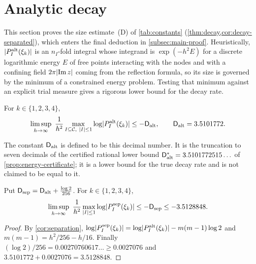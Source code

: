 \section{Analytic decay}\label{sec:decay}

This section proves the size estimate~(D) of \cref{tab:constants}
(\cref{thm:decay,cor:decay-separated}), which enters the final deduction in
\cref{subsec:main-proof}. Heuristically, $\lvert P^{\mathrm{alt}}_I(\xi_k)\rvert$ is an $n_I$-fold integral whose
integrand is $\exp(-h^2E)$ for a discrete logarithmic energy $E$ of free points interacting with
the nodes and with a confining field $2\pi\lvert \operatorname{Im}z\rvert$ coming from the reflection
formula, so its size is governed by the minimum of a constrained energy problem. Testing that
minimum against an explicit trial measure gives a rigorous lower bound for the decay rate.

\begin{theorem}\label{thm:decay}
For $k\in\{1,2,3,4\}$,
\[
  \limsup_{h\to\infty}\ \frac1{h^2}\max_{I\subseteq\Com,\ \abs I\le1}\log\abs{P^{\alt}_I(\xi_k)}
  \le-\cD_{\alt},\qquad \cD_{\alt}=3.5101772 .
\]
\end{theorem}

The constant $\mathsf{D}_{\mathrm{alt}}$ is defined to be this decimal number. It is the truncation to seven
decimals of the certified rational lower bound $\mathsf{D}^{*}_{\mathrm{alt}}=3.5101772515\ldots$ of
\cref{prop:energy-certificate}; it is a lower bound for the true decay rate and is not claimed
to be equal to it.

\begin{corollary}\label{cor:decay-separated}
Put $\mathsf{D}_{\mathrm{sep}}=\mathsf{D}_{\mathrm{alt}}+\frac{\log2}{256}$. For $k\in\{1,2,3,4\}$,
\[
  \limsup_{h\to\infty}\ \frac1{h^2}\max_{\lvert I\rvert\le1}\log\lvert P^{\mathrm{sep}}_I(\xi_k)\rvert\le-\mathsf{D}_{\mathrm{sep}}
  \le-3.5128848 .
\]
\end{corollary}

\begin{proof}
By \cref{cor:separation},
$\log\lvert P^{\mathrm{sep}}_I(\xi_k)\rvert=\log\lvert P^{\mathrm{alt}}_I(\xi_k)\rvert-m(m-1)\log2$ and
$m(m-1)=h^2/256-h/16$. Finally $(\log2)/256=0.00270760617\ldots\ge0.0027076$ and
$3.5101772+0.0027076=3.5128848$.
\end{proof}

